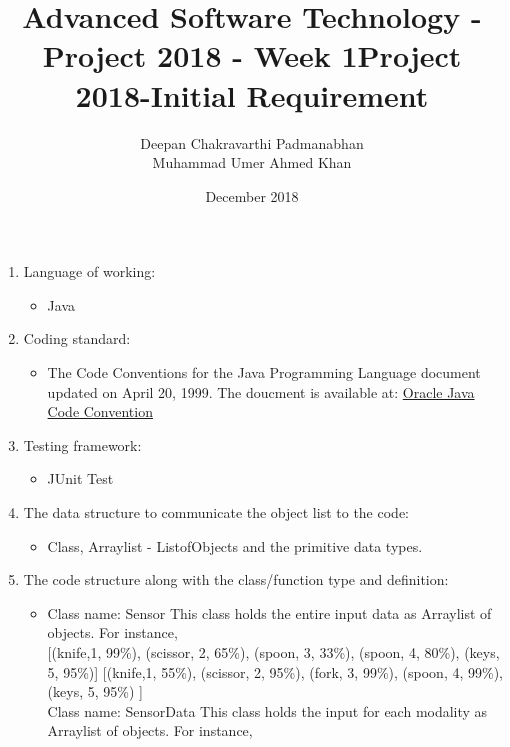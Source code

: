 \documentclass{article}
\title{Advanced Software Technology - Project 2018 - Week 1}
\author{Deepan Chakravarthi Padmanabhan\\ Muhammad Umer Ahmed Khan}
\date{December 2018}
\begin{document}
\maketitle
\newpage
\begin{center}
\title{Project 2018-Initial Requirement}
\end{center}
\begin{enumerate}
    \item Language of working:
    \begin{itemize}
        \item Java
    \end{itemize}
\item Coding standard:
\begin{itemize}
\item The Code Conventions for the Java Programming Language document updated on April 20, 1999. The doucment is available at: \href{https://www.oracle.com/technetwork/java/javase/documentation/codeconvtoc-136057.html}
{Oracle Java Code Convention}
\end {itemize}

\item Testing framework:
\begin{itemize}
\item JUnit Test 
\end {itemize}

\item{The data structure to communicate the object list to the code:}
\begin{itemize}
    \item Class, Arraylist - ListofObjects and the primitive data types.
\end{itemize}
\item The code structure along with the class/function type and definition:
\begin{itemize}
    \item Class name: Sensor 
    This class holds the entire input data as Arraylist of objects. For instance,\\
    
    [(knife,1, 99\%), (scissor, 2, 65\%), (spoon, 3, 33\%), (spoon, 4, 80\%), (keys, 5, 95\%)]
    [(knife,1, 55\%), (scissor, 2, 95\%), (fork, 3, 99\%), (spoon, 4, 99\%), (keys, 5, 95\%) ]\\
    
    Class name: SensorData
    This class holds the input for each modality as Arraylist of objects. For instance,\\
    

\end{itemize}
\end{enumerate}
\end{document}
